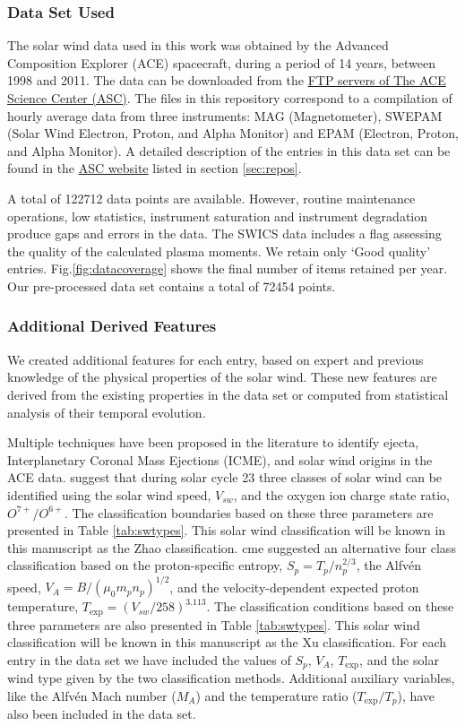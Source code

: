 \subsubsection{Data Set Used}
The solar wind data used in this work was obtained by the Advanced Composition Explorer (ACE) spacecraft, during a period of 14 years, between 1998 and 2011. The data can be downloaded from the \href{ftp://mussel.srl.caltech.edu/pub/ace/level2/multi}{FTP servers of The ACE Science Center (ASC)}. The files in this repository correspond to a compilation of hourly average data from three instruments: MAG (Magnetometer), SWEPAM (Solar Wind Electron, Proton, and Alpha Monitor) and EPAM (Electron, Proton, and Alpha Monitor). A detailed description of the entries in this data set can be found in the \href{http://www.srl.caltech.edu/cgi-bin/dib/rundibviewmultil2/ACE/ASC/DATA/level2/multi}{ASC website} listed in section \ref{sec:repos}.

A total of 122712 data points are available. However, routine maintenance operations, low statistics, instrument saturation and instrument degradation produce gaps and errors in the data. The SWICS data includes a flag assessing the quality of the calculated plasma moments. We retain only `Good quality' entries. Fig.\ref{fig:datacoverage} shows the final number of items retained per year. Our pre-processed data set contains a total of 72454 points.

\subsubsection{Additional Derived Features}
We created additional features for each entry, based on expert and previous knowledge of the physical properties of the solar wind. These new features are derived from the existing properties in the data set or computed from statistical analysis of their temporal evolution.

Multiple techniques have been proposed in the literature to identify ejecta, Interplanetary Coronal Mass Ejections (ICME), and solar wind origins in the ACE data. \citep{Zhao2009} suggest that during solar cycle 23 three classes of solar wind can be identified using the solar wind speed, $V_{sw}$, and the oxygen ion charge state ratio, $O^{7+}/O^{6+}$. The classification boundaries based on these three parameters are presented in Table \ref{tab:swtypes}. This solar wind classification will be known in this manuscript as the Zhao classification.
cme
\citep{Xu2015} suggested an alternative four class classification based on the proton-specific entropy, $S_p = T_p/n_p^{2/3}$, the Alfv\'en speed, $V_A = B / (\mu_0 m_p n_p)^{1/2}$, and the velocity-dependent expected proton temperature, $T_\text{exp} = (V_{sw}/258)^{3.113}$. The classification conditions based on these three parameters are also presented in Table \ref{tab:swtypes}. This solar wind classification will be known in this manuscript as the Xu classification. For each entry in the data set we have included the values of $S_p$, $V_A$, $T_\text{exp}$, and the solar wind type given by the two classification methods. Additional auxiliary variables, like the Alfv\'en Mach number ($M_A$) and the temperature ratio ($T_\text{exp}/T_p$), have also been included in the data set.


